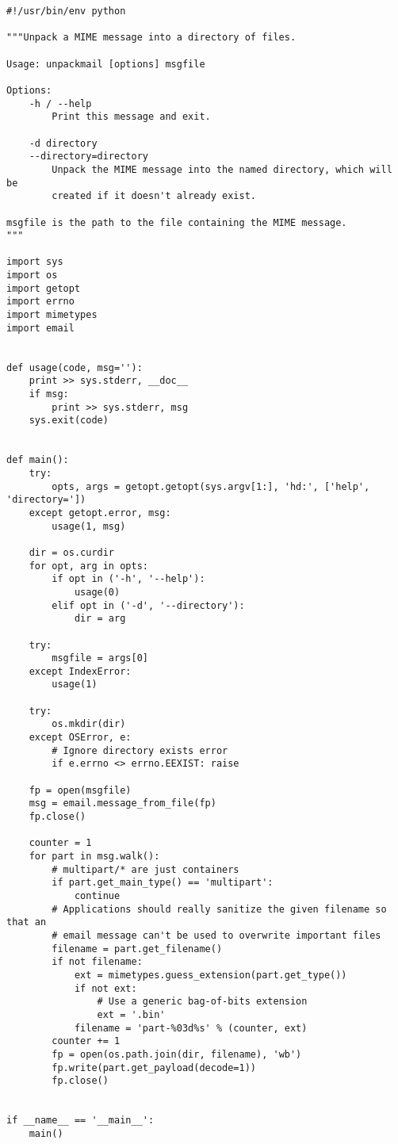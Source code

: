 \begin{verbatim}
#!/usr/bin/env python

"""Unpack a MIME message into a directory of files.

Usage: unpackmail [options] msgfile

Options:
    -h / --help
        Print this message and exit.

    -d directory
    --directory=directory
        Unpack the MIME message into the named directory, which will be
        created if it doesn't already exist.

msgfile is the path to the file containing the MIME message.
"""

import sys
import os
import getopt
import errno
import mimetypes
import email


def usage(code, msg=''):
    print >> sys.stderr, __doc__
    if msg:
        print >> sys.stderr, msg
    sys.exit(code)


def main():
    try:
        opts, args = getopt.getopt(sys.argv[1:], 'hd:', ['help', 'directory='])
    except getopt.error, msg:
        usage(1, msg)

    dir = os.curdir
    for opt, arg in opts:
        if opt in ('-h', '--help'):
            usage(0)
        elif opt in ('-d', '--directory'):
            dir = arg

    try:
        msgfile = args[0]
    except IndexError:
        usage(1)

    try:
        os.mkdir(dir)
    except OSError, e:
        # Ignore directory exists error
        if e.errno <> errno.EEXIST: raise

    fp = open(msgfile)
    msg = email.message_from_file(fp)
    fp.close()

    counter = 1
    for part in msg.walk():
        # multipart/* are just containers
        if part.get_main_type() == 'multipart':
            continue
        # Applications should really sanitize the given filename so that an
        # email message can't be used to overwrite important files
        filename = part.get_filename()
        if not filename:
            ext = mimetypes.guess_extension(part.get_type())
            if not ext:
                # Use a generic bag-of-bits extension
                ext = '.bin'
            filename = 'part-%03d%s' % (counter, ext)
        counter += 1
        fp = open(os.path.join(dir, filename), 'wb')
        fp.write(part.get_payload(decode=1))
        fp.close()


if __name__ == '__main__':
    main()
\end{verbatim}
